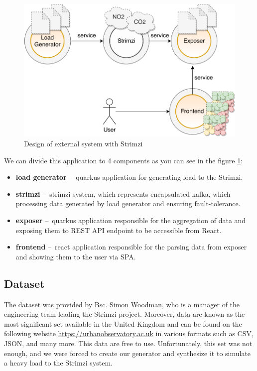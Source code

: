\documentclass{ExcelAtFIT}
\begin{document}
\begin{figure}[h!]
	\centering
	\includegraphics[width=1\linewidth]{images/03-externalSystem/ApplicationWithStrimziOrange.pdf}
	\caption{Design of external system with Strimzi}
	\label{fig:externalSystem:design}
\end{figure}

We can divide this application to 4 components as you can see in the figure \ref{fig:externalSystem:design}:
\begin{itemize}
	\item \textbf{load generator} \---\ quarkus application for generating load to the Strimzi.
	\item \textbf{strimzi} \---\ strimzi system, which represents encapsulated kafka, which processing data generated by load generator and ensuring fault-tolerance.
	\item \textbf{exposer} \---\ quarkus application responsible for the aggregation of data and exposing them to REST API endpoint to be accessible from React.
	\item \textbf{frontend} \---\ react application responsible for the parsing  data from exposer and showing them to the user via SPA.
\end{itemize}

\subsection{Dataset}

The dataset was provided by Bsc. Simon Woodman, who is a manager of the engineering team leading the Strimzi project. Moreover, data are known as the most significant set available in the United Kingdom and can be found on the following website \url{https://urbanobservatory.ac.uk} in various formats such as CSV, JSON, and many more. This data are free to use. Unfortunately, this set was not enough, and we were forced to create our generator and synthesize it to simulate a heavy load to the Strimzi system.
\end{document}
